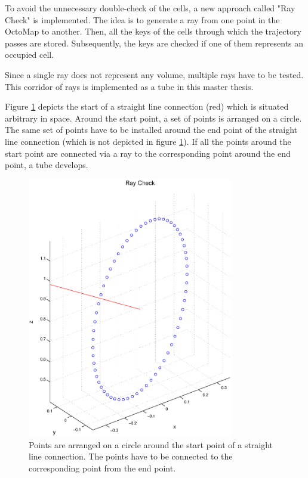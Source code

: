 To avoid the unnecessary double-check of the cells, a new approach called "Ray Check" is implemented. The idea is to generate a ray from one point in the OctoMap to another. Then, all the keys of the cells through which the trajectory passes are stored. Subsequently, the keys are checked if one of them represents an occupied cell. \newpage

Since a single ray does not represent any volume, multiple rays have to be tested. This corridor of rays is implemented as a tube in this master thesis.\newline

Figure \ref{pic:RayCheck} depicts the start of a straight line connection (red) which is situated arbitrary in space. Around the start point, a set of points is arranged on a circle. The same set of points have to be installed around the end point of the straight line connection (which is not depicted in figure \ref{pic:RayCheck}). If all the points around the start point are connected via a ray to the corresponding point around the end point, a tube develops.




\begin{figure}[h]
   \centering
   \includegraphics[trim = 25mm 10mm 30mm 10mm,clip,width=0.8\textwidth]{pics/RayCheck.eps}
   \caption{Points are arranged on a circle around the start point of a straight line connection. The points have to be connected to the corresponding point from the end point.}
   \label{pic:RayCheck}
\end{figure}

